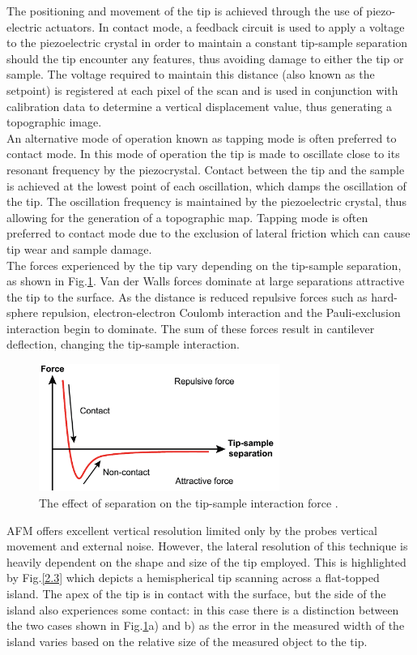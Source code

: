 The positioning and movement of the tip is achieved through the use of piezo-electric actuators. In contact mode, a feedback circuit is used to apply a voltage to the piezoelectric crystal in order to maintain a constant tip-sample separation should the tip encounter any features, thus avoiding damage to either the tip or sample. The voltage required to maintain this distance (also known as the setpoint) is registered at each pixel of the scan and is used in conjunction with calibration data to determine a vertical displacement value, thus generating a topographic image.\\
An alternative mode of operation known as tapping mode is often preferred to contact mode. In this mode of operation the tip is made to oscillate close to its resonant frequency by the piezocrystal. Contact  between the tip and the sample is achieved at the lowest point of each oscillation, which damps the oscillation of the tip. The oscillation frequency is maintained by the piezoelectric crystal, thus allowing for the generation of a topographic map. Tapping mode is often preferred to contact mode due to the exclusion of lateral friction which can cause tip wear and sample damage.\\
The forces experienced by the tip vary depending on the tip-sample separation, as shown in Fig.\ref{2.2}. Van der Walls forces dominate at large separations attractive the tip to the surface. As the distance is reduced repulsive forces such as hard-sphere repulsion, electron-electron Coulomb interaction and the Pauli-exclusion interaction begin to dominate. The sum of these forces result in cantilever deflection, changing the tip-sample interaction.

\begin{figure}[h]
	\centering
	\includegraphics[width=0.7\textwidth]{Figs/Ch2/AFMint.png}
	\caption {The effect of separation on the tip-sample interaction force \cite{Zhu2010}.}
	\label{2.2}
\end{figure}
\FloatBarrier

AFM offers excellent vertical resolution limited only by the probes vertical movement and external noise. However, the lateral resolution of this technique is heavily dependent on the shape and size of the tip employed. This is highlighted by Fig.\ref{2.3} which depicts a hemispherical tip scanning across a flat-topped island. The apex of the tip is in contact with the surface, but the side of the island also experiences some contact: in this case there is a distinction between the two cases shown in Fig.\ref{2.2}a) and b) as the error in the measured width of the island varies based on the relative size of the measured object to the tip.

